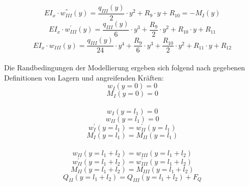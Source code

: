 \begin{equation}\label{eq:19}
	EI_{x}\cdot w_{III}^{''}(y) = \frac{q_{III}(y)}{2}\cdot y^{2} + R_{9}\cdot y + R_{10} = -M_{I}(y)
\end{equation}
\begin{equation}\label{eq:20}
	EI_{x}\cdot w_{III}^{'}(y) = \frac{q_{III}(y)}{6}\cdot y^{3} + \frac{R_{9}}{2}\cdot y^{2} + R_{10}\cdot y + R_{11} 
\end{equation}
\begin{equation}\label{eq:21}
	EI_{x}\cdot w_{III}(y) = \frac{q_{III}(y)}{24}\cdot y^{4} + \frac{R_{9}}{6}\cdot y^{3} + \frac{R_{10}}{2}\cdot y^{2} + R_{11}\cdot y + R_{12}
\end{equation}\\

\noindent Die Randbedingungen der Modellierung ergeben sich folgend nach gegebenen Definitionen von Lagern und angreifenden Kräften: 
\begin{equation}\label{eq:22}
	w_{I}(y=0)=0
\end{equation}
\begin{equation}\label{eq:23}
	M_{I}(y=0)=0
\end{equation}\\
\begin{equation}\label{eq:24}
	w_{I}(y=l_{1}) = 0
\end{equation}
\begin{equation}\label{eq:25}
	w_{II}(y=l_{1}) = 0
\end{equation}
\begin{equation}\label{eq:26}
	w_{I}^{'}(y=l_{1}) = w_{II}^{'}(y=l_{1})
\end{equation}
\begin{equation}\label{eq:27}
	M_{I}(y=l_{1}) = M_{II}(y=l_{1})
\end{equation}\\
\begin{equation}\label{eq:28}
	w_{II}(y=l_{1}+l_{2}) = w_{III}(y=l_{1}+l_{2})
\end{equation}
\begin{equation}\label{eq:29}
	w_{II}^{'}(y=l_{1}+l_{2}) = w_{III}^{'}(y=l_{1}+l_{2})
\end{equation}
\begin{equation}\label{eq:30}
	M_{II}(y=l_{1}+l_{2}) = M_{III}(y=l_{1}+l_{2})
\end{equation}
\begin{equation}\label{eq:31}
	Q_{II}(y=l_{1}+l_{2}) = Q_{III}(y=l_{1}+l_{2})+F_{Q}
\end{equation}\\
